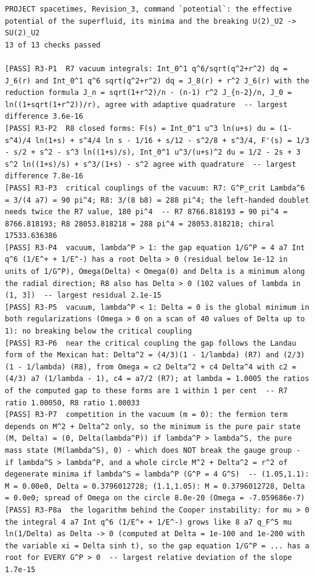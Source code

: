 \documentclass[
  10pt,
]{article}
\begin{document}
\begin{verbatim}
PROJECT spacetimes, Revision_3, command `potential`: the effective potential of the superfluid, its minima and the breaking U(2)_U2 -> SU(2)_U2
13 of 13 checks passed

[PASS] R3-P1  R7 vacuum integrals: Int_0^1 q^6/sqrt(q^2+r^2) dq = J_6(r) and Int_0^1 q^6 sqrt(q^2+r^2) dq = J_8(r) + r^2 J_6(r) with the reduction formula J_n = sqrt(1+r^2)/n - (n-1) r^2 J_{n-2}/n, J_0 = ln((1+sqrt(1+r^2))/r), agree with adaptive quadrature  -- largest difference 3.6e-16
[PASS] R3-P2  R8 closed forms: F(s) = Int_0^1 u^3 ln(u+s) du = (1-s^4)/4 ln(1+s) + s^4/4 ln s - 1/16 + s/12 - s^2/8 + s^3/4, F'(s) = 1/3 - s/2 + s^2 - s^3 ln((1+s)/s), Int_0^1 u^3/(u+s)^2 du = 1/2 - 2s + 3 s^2 ln((1+s)/s) + s^3/(1+s) - s^2 agree with quadrature  -- largest difference 7.8e-16
[PASS] R3-P3  critical couplings of the vacuum: R7: G^P_crit Lambda^6 = 3/(4 a7) = 90 pi^4; R8: 3/(8 b8) = 288 pi^4; the left-handed doublet needs twice the R7 value, 180 pi^4  -- R7 8766.818193 = 90 pi^4 = 8766.818193; R8 28053.818218 = 288 pi^4 = 28053.818218; chiral 17533.636386
[PASS] R3-P4  vacuum, lambda^P > 1: the gap equation 1/G^P = 4 a7 Int q^6 (1/E^+ + 1/E^-) has a root Delta > 0 (residual below 1e-12 in units of 1/G^P), Omega(Delta) < Omega(0) and Delta is a minimum along the radial direction; R8 also has Delta > 0 (102 values of lambda in (1, 3])  -- largest residual 2.1e-15
[PASS] R3-P5  vacuum, lambda^P < 1: Delta = 0 is the global minimum in both regularizations (Omega > 0 on a scan of 40 values of Delta up to 1): no breaking below the critical coupling
[PASS] R3-P6  near the critical coupling the gap follows the Landau form of the Mexican hat: Delta^2 = (4/3)(1 - 1/lambda) (R7) and (2/3)(1 - 1/lambda) (R8), from Omega = c2 Delta^2 + c4 Delta^4 with c2 = (4/3) a7 (1/lambda - 1), c4 = a7/2 (R7); at lambda = 1.0005 the ratios of the computed gap to these forms are 1 within 1 per cent  -- R7 ratio 1.00050, R8 ratio 1.00033
[PASS] R3-P7  competition in the vacuum (m = 0): the fermion term depends on M^2 + Delta^2 only, so the minimum is the pure pair state (M, Delta) = (0, Delta(lambda^P)) if lambda^P > lambda^S, the pure mass state (M(lambda^S), 0) - which does NOT break the gauge group - if lambda^S > lambda^P, and a whole circle M^2 + Delta^2 = r^2 of degenerate minima if lambda^S = lambda^P (G^P = 4 G^S)  -- (1.05,1.1): M = 0.00e0, Delta = 0.3796012728; (1.1,1.05): M = 0.3796012728, Delta = 0.0e0; spread of Omega on the circle 8.0e-20 (Omega = -7.059686e-7)
[PASS] R3-P8a  the logarithm behind the Cooper instability: for mu > 0 the integral 4 a7 Int q^6 (1/E^+ + 1/E^-) grows like 8 a7 q_F^5 mu ln(1/Delta) as Delta -> 0 (computed at Delta = 1e-100 and 1e-200 with the variable xi = Delta sinh t), so the gap equation 1/G^P = ... has a root for EVERY G^P > 0  -- largest relative deviation of the slope 1.7e-15

\end{verbatim}
\end{document}
